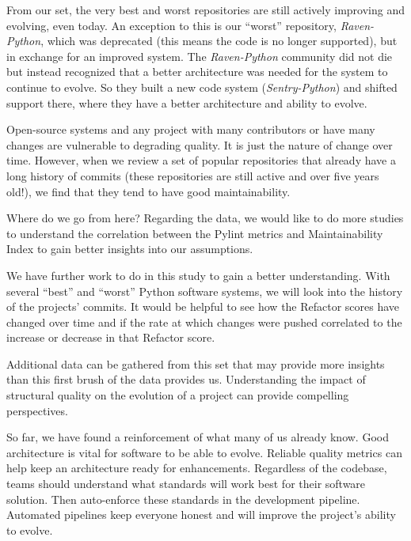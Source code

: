 From our set, the very best and worst repositories are still actively improving and evolving, even today. An exception to this is our ``worst'' repository, \emph{Raven-Python}, which was deprecated (this means the code is no longer supported), but in exchange for an improved system. The \emph{Raven-Python} community did not die but instead recognized that a better architecture was needed for the system to continue to evolve. So they built a new code system (\emph{Sentry-Python}) and shifted support there, where they have a better architecture and ability to evolve.

Open-source systems and any project with many contributors or have many changes are vulnerable to degrading quality. It is just the nature of change over time. However, when we review a set of popular repositories that already have a long history of commits (these repositories are still active and over five years old!), we find that they tend to have good maintainability.

Where do we go from here? Regarding the data, we would like to do more studies to understand the correlation between the Pylint metrics and Maintainability Index to gain better insights into our assumptions.

We have further work to do in this study to gain a better understanding. With several ``best'' and ``worst'' Python software systems, we will look into the history of the projects' commits. It would be helpful to see how the Refactor scores have changed over time and if the rate at which changes were pushed correlated to the increase or decrease in that Refactor score.

Additional data can be gathered from this set that may provide more insights than this first brush of the data provides us. Understanding the impact of structural quality on the evolution of a project can provide compelling perspectives.

So far, we have found a reinforcement of what many of us already know. Good architecture is vital for software to be able to evolve. Reliable quality metrics can help keep an architecture ready for enhancements. Regardless of the codebase, teams should understand what standards will work best for their software solution. Then auto-enforce these standards in the development pipeline. Automated pipelines keep everyone honest and will improve the project's ability to evolve.
